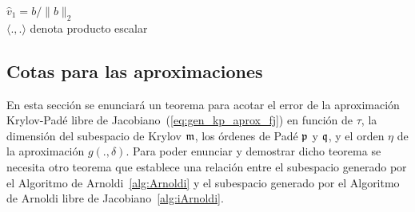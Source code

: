 
{\SetAlgoNoLine
	\begin{algorithm}[htb]
		\caption{Algoritmo de Arnoldi libre de Jacobiano para construir una base ortonormal $\{\widehat{v}_1,\ldots,\widehat{v}_\mf \}$
			del $\mf$-ésimo subespacio de Krylov $\widehat{\mathcal{K}}_\mf(\tau f_x(y),b;\delta) = \mathrm{span} \left\{ b,\widehat{q}_1,\ldots,\widehat{q}_{\mf-1} \right\}$}
		\label{alg:iArnoldi}
		$\widehat{v}_1=b/\lVert b \rVert_2$\\
	\nonl $\langle . , .\rangle$ denota producto escalar
	\end{algorithm}
}

 \subsection{Cotas para las aproximaciones}
  En esta sección se enunciará un teorema para acotar el error de la aproximación Krylov-Padé libre de Jacobiano~(\ref{eq:gen_kp_aprox_fj}) en función de $\tau$, la dimensión del subespacio de Krylov $\mf$, los órdenes de Padé $\mathfrak{p}$ y $\mathfrak{q}$, y el orden $\eta$ de la aproximación $g(.,\delta)$. Para poder enunciar  y demostrar dicho teorema se necesita otro teorema que establece una relación entre el subespacio generado por el Algoritmo de Arnoldi~\ref{alg:Arnoldi} y el subespacio generado por el Algoritmo de Arnoldi libre de Jacobiano~\ref{alg:iArnoldi}.

